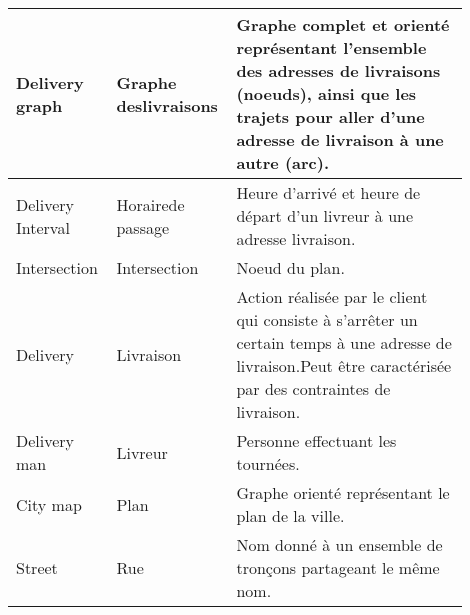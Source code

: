 \begin{longtable}{|p{0.2\linewidth}|p{0.2\linewidth}|p{0.5\linewidth}|}
Delivery graph                              & Graphe deslivraisons           & Graphe complet et orienté représentant l'ensemble des adresses de livraisons (noeuds), ainsi que les trajets pour aller d'une adresse de livraison à une autre (arc).                                                                                                                \\ \hline
Delivery Interval                           & Horairede passage              & Heure d'arrivé et heure de départ d'un livreur à une adresse livraison.                                                                                                                                                                                                             \\ \hline
Intersection                                & Intersection                   & Noeud du plan.                                                                                                                                                                                                                                                                      \\ \hline
Delivery                                    & Livraison                      & Action réalisée par le client qui consiste à s'arrêter un certain temps à une adresse de livraison.Peut être caractérisée par des contraintes de livraison.                                                                                                                         \\ \hline
Delivery man                                & Livreur                        & Personne effectuant les tournées.                                                                                                                                                                                                                                                   \\ \hline
City map                                    & Plan                           & Graphe orienté représentant le plan de la ville.                                                                                                                                                                                                                                    \\ \hline
Street                                      & Rue                            & Nom donné à un ensemble de tronçons partageant le même nom.                                                                                                                                                                                                                         \\ \hline

\end{longtable}
